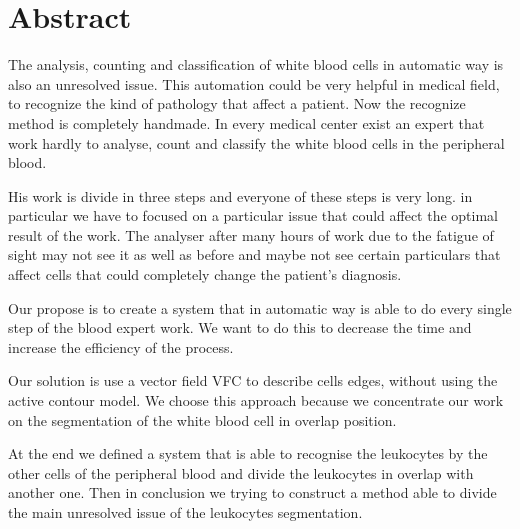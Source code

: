 \chapter*{Abstract}

The analysis, counting and classification of white blood cells in automatic way is also an unresolved issue. This automation could be very helpful in medical field, to recognize the kind of pathology that affect a patient. Now the recognize method is completely handmade. In every medical center exist an expert that work hardly to analyse, count and classify the white blood cells in the peripheral blood.

\bigskip

His work is divide in three steps and everyone of these steps is very long. in particular we have to focused on a particular issue that could affect the optimal result of the work. The analyser after many hours of work due to the fatigue of sight may not see it as well as before and maybe not see certain particulars that affect cells that could completely change the patient's diagnosis.

\bigskip

Our propose is to create a system that in automatic way is able to do every single step of the blood expert work. We want to do this to decrease the time and increase the efficiency of the process.

\bigskip

Our solution is use a vector field VFC to describe cells edges, without using the active contour model. We choose this approach because we concentrate our work on the segmentation of the white blood cell in overlap position.

\bigskip

At the end we defined a system that is able to recognise the leukocytes by the other cells of the peripheral blood and divide the leukocytes in overlap with another one. Then in conclusion we trying to construct a method able to divide the main unresolved issue of the leukocytes segmentation.


